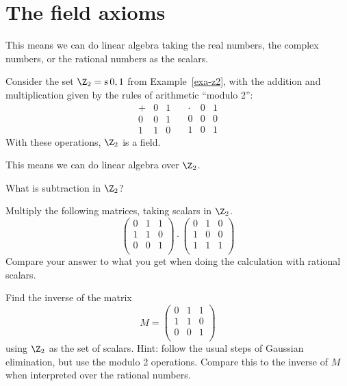 {\section{The field axioms}

This means we can do linear algebra taking the real numbers, the complex
numbers, or the rational numbers as the scalars.

\begin{example}
  Consider the set $\Z_2=\s{0,1}$ from Example~\ref{exa-z2}, with the
  addition and multiplication given by the rules of arithmetic
  ``modulo 2'':
  \[ \begin{array}{l|ll}
    +&0&1 \\\hline
    0&0&1 \\
    1&1&0
  \end{array}
  \quad
  \begin{array}{l|ll}
    \cdot&0&1 \\\hline
    0&0&0 \\
    1&0&1
  \end{array}
  \]
  With these operations, $\Z_2$ is a field.
\end{example}

This means we can do linear algebra over $\Z_2$. 

\begin{nproblem}
  What is subtraction in $\Z_2$?
\end{nproblem}

\begin{nproblem}
Multiply the following matrices, taking scalars in $\Z_2$. 
\[   \left(\begin{array}{lll}
      0&1&1\\
      1&1&0\\
      0&0&1\\
    \end{array}
  \right)\cdot
  \left(\begin{array}{lll}
      0&1&0\\
      1&0&0\\
      1&1&1\\
    \end{array}
  \right)
\]
Compare your answer to what you get when doing the calculation with
rational scalars. 
\end{nproblem}

\begin{nproblem}
Find the inverse of the matrix 
\[   M=\left(\begin{array}{lll}
      0&1&1\\
      1&1&0\\
      0&0&1\\
    \end{array}
  \right)
\]
using $\Z_2$ as the set of scalars. Hint: follow the usual steps of
Gaussian elimination, but use the modulo 2 operations. Compare this to
the inverse of $M$ when interpreted over the rational numbers.
\end{nproblem}

}

